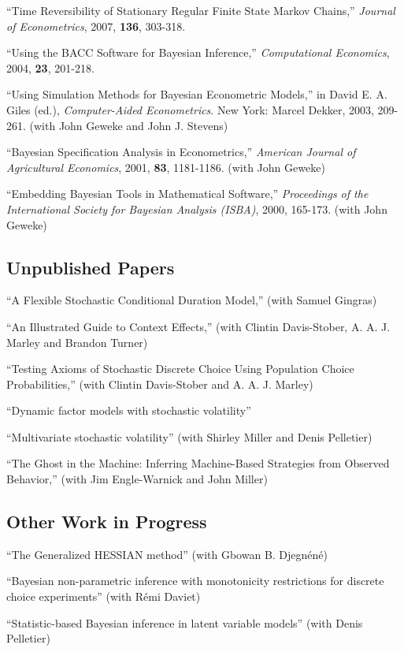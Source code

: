 \documentclass[12pt]{article}
\begin{document}
``Time Reversibility of Stationary Regular Finite State Markov Chains,''  {\it Journal of Econometrics},
2007,
{\bf 136}, 303-318.

``Using the BACC Software for Bayesian Inference,'' {\it Computational Economics},
2004,
{\bf 23}, 201-218.

``Using Simulation Methods for Bayesian Econometric Models,''  in  David E. A. Giles (ed.), {\it Computer-Aided Econometrics}.
New York: Marcel Dekker, 2003, 209-261. (with John Geweke and John J. Stevens)

``Bayesian Specification Analysis in Econometrics,''  {\it American Journal of Agricultural Economics},
2001,
{\bf 83}, 1181-1186. (with John Geweke)

``Embedding Bayesian Tools in Mathematical Software,''  {\it Proceedings of the International Society for Bayesian Analysis (ISBA)}, 
2000, 165-173.
 (with John Geweke)

\subsection*{Unpublished Papers}

``A Flexible Stochastic Conditional Duration Model,''
(with Samuel Gingras)

``An Illustrated Guide to Context Effects,''
(with Clintin Davis-Stober, A. A. J. Marley and Brandon Turner)

``Testing Axioms of Stochastic Discrete Choice Using Population Choice Probabilities,'' (with Clintin Davis-Stober and A. A. J. Marley)

``Dynamic factor models with stochastic volatility''

``Multivariate stochastic volatility'' (with Shirley Miller and Denis Pelletier)

``The Ghost in the Machine: Inferring Machine-Based Strategies from Observed Behavior,'' (with Jim Engle-Warnick and John Miller)

\subsection*{Other Work in Progress}

``The Generalized HESSIAN method'' (with Gbowan B. Djegn\'en\'e)

``Bayesian non-parametric inference with monotonicity restrictions for discrete choice experiments'' (with R\'emi Daviet)

``Statistic-based Bayesian inference in latent variable models'' (with Denis Pelletier)
\end{document}
